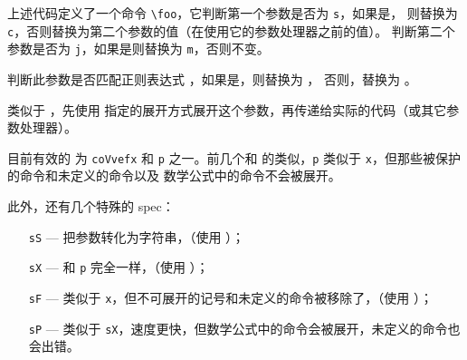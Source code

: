 \documentclass[twoside]{book}
\def\xampletext{\par}
\def\xampleprint{\xamplecode \xampleline \xampletext}
\begin{document}
上述代码定义了一个命令 \verb|\foo|，它判断第一个参数是否为 \verb|s|，如果是，
则替换为 \verb|c|，否则替换为第二个参数的值（在使用它的参数处理器之前的值）。
判断第二个参数是否为 \verb|j|，如果是则替换为 \verb|m|，否则不变。

\begin{function}{\ReplaceArgumentIfMatch}
  \begin{syntax}
    \V\ReplaceArgumentIfMatch {}  
  \end{syntax}
判断此参数是否匹配正则表达式 ，如果是，则替换为 ，
否则，替换为 。
\end{function}

\begin{function}{\ExpandArgument}
  \begin{syntax}
    \V\ExpandArgument {}
  \end{syntax}
类似于 ，先使用  指定的展开方式展开这个参数，再传递给实际的代码（或其它参数处理器）。

目前有效的  为 \verb|coVvefx| 和 \verb|p| 之一。前几个和 
的类似，\verb|p| 类似于 \verb|x|，但那些被保护的命令和未定义的命令以及
数学公式中的命令不会被展开。

此外，还有几个特殊的 spec：
\begin{itemize}
  \item[\texttt{sS}] --- 把参数转化为字符串，（使用 ）；
  \item[\texttt{sX}] --- 和 \verb|p| 完全一样，（使用 ）；
  \item[\texttt{sF}] --- 类似于 \verb|x|，但不可展开的记号和未定义的命令被移除了，（使用 ）；
  \item[\texttt{sP}] --- 类似于 \verb|sX|，速度更快，但数学公式中的命令会被展开，未定义的命令也会出错。
\end{itemize}
\end{function}

\end{document}
